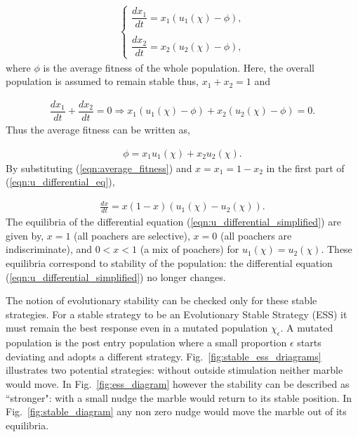\documentclass[10pt]{article}
\begin{document}
\begin{eqnarray}
    \label{eqn:u_differential_eq}
    \left\{
    \begin{array}{cl}
    \dfrac{dx_1}{dt}=x_1(u_1(\chi)-\phi),
    \\
    \\
    \dfrac{dx_2}{dt}= x_2(u_2(\chi)-\phi),
    \end{array} \right.
\end{eqnarray}
where \(\phi\) is the average fitness of the whole population. Here, the overall 
population is assumed to remain stable thus, \(x_1 + x_2 = 1 \) and

\begin{eqnarray}
    \dfrac{dx_1}{dt}  + \dfrac{dx_2}{dt} = 0 \Rightarrow x_1(u_1(\chi) - \phi)
     + x_2(u_2(\chi) - \phi)=0.
\end{eqnarray} 
Thus the average fitness can be written as,

\begin{eqnarray}
\label{eqn:average_fitness}
    \phi=x_1u_1(\chi) + x_2u_2(\chi).
\end{eqnarray}
By substituting (\ref{eqn:average_fitness}) and \(x=x_1= 1 - x_2\) 
in the first part of (\ref{eqn:u_differential_eq}),

\begin{eqnarray}
    \label{eqn:u_differential_simplified}
    \frac{dx}{dt}= x(1 - x)(u_1(\chi) - u_2(\chi)).
\end{eqnarray}
The equilibria of the differential equation (\ref{eqn:u_differential_simplified})
are given by, \(x=1\) (all poachers are selective), \(x=0\) (all poachers are indiscriminate), and \(0<x<1\) (a mix of poachers) for \(u_1(\chi)=u_2(\chi)\).
These equilibria correspond to stability of the population: the differential 
equation (\ref{eqn:u_differential_simplified}) no longer changes. 

The notion of evolutionary stability can be checked only for these stable strategies.
For a stable strategy to be an Evolutionary Stable Strategy (ESS) it must remain 
the best response even in a mutated population \(\chi_\epsilon\). A mutated population 
is the post entry population 
where a small proportion \(\epsilon\) starts deviating and adopts a different strategy.
Fig.~\ref{fig:stable_ess_driagrams} illustrates two potential strategies: without 
outside stimulation neither marble would move. In Fig.~\ref{fig:ess_diagram}
however the stability can be described as ``stronger": with a small nudge the marble
would return to its stable position. In Fig.~\ref{fig:stable_diagram} any non zero
nudge would move the marble out of its equilibria.
\end{document}
